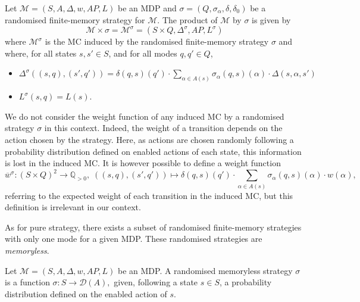 \begin{definition}
  Let $\mathcal{M}=(S, A, \Delta, w, AP, L)$ be an MDP and $\sigma=(Q, \sigma_\alpha, \delta, \delta_0)$ be a randomised finite-memory strategy for $\mathcal{M}$.
  The product of $\mathcal{M}$ by $\sigma$ is given by
  \[
    \mathcal{M} \times \sigma = \mathcal{M}^\sigma = (S \times Q, \Delta^\sigma, AP, L^\sigma)
  \]
  where $\mathcal{M}^\sigma$ is the MC induced by the randomised finite-memory strategy $\sigma$ and where, for all states $s, s' \in S$, and for all modes $q, q' \in Q$,
  \begin{itemize}
    \item $\Delta^\sigma((s, q), (s', q')) =
    \delta(q, s)(q') \cdot \sum_{\alpha \in A(s)} \sigma_\alpha(q, s)(\alpha) \cdot \Delta(s, \alpha, s')$
    \item $L^\sigma(s, q) = L(s)$.
  \end{itemize}
\end{definition}

\begin{remark}
  We do not consider the weight function of any induced MC by a randomised strategy $\sigma$ in this context.
  Indeed, the weight of a transition depends on the action chosen by the strategy. Here, as actions are chosen randomly following a probability distribution defined on enabled actions of each state, this information is lost in the induced MC.
  It is however possible to define a weight function
  \[
    \overline{w}^\sigma: (S \times Q)^2 \rightarrow \mathbb{Q}_{>0}, \; ((s, q), (s', q')) \mapsto \delta(q, s)(q') \cdot \sum_{\alpha \in A(s)} \sigma_{\alpha}(q, s)(\alpha) \cdot w(\alpha),
  \]
  referring to the expected weight of each transition in the induced MC, but this definition is irrelevant in our context.
\end{remark}

As for pure strategy, there exists a subset of randomised finite-memory strategies with only one mode for a given MDP.
These randomised strategies are \textit{memoryless}.

\begin{definition}
  Let $\mathcal{M}=(S, A, \Delta, w, AP, L)$ be an MDP. A randomised memoryless strategy $\sigma$ is a function
  $
    \sigma: S \rightarrow \mathcal{D}(A),
  $ given, following a state $s \in S$, a probability distribution defined on the enabled action of $s$.
\end{definition}

